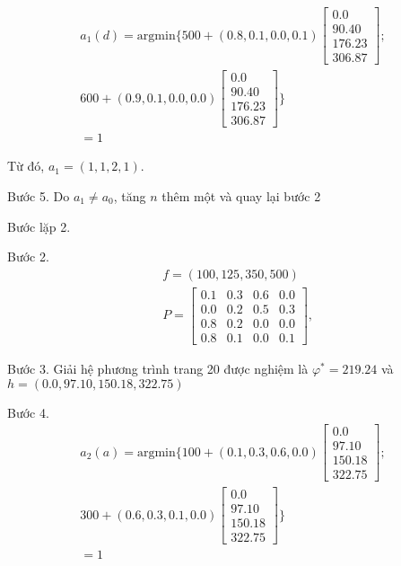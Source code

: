 \documentclass[12pt,a4paper]{report}
\begin{document}
\begin{align*}
a_1(d)=\mathrm{argmin}\{500+(0.8,0.1, 0.0,0.1)
\left[
\begin{array}{c}
0.0\\
90.40\\
176.23\\
306.87
\end{array}
\right];\\
600+(0.9,0.1,0.0,0.0)
\left[
\begin{array}{c}
0.0\\
90.40\\
176.23\\
306.87
\end{array}
\right]\}\\
=1
\end{align*}

Từ đó, $a_1=(1,1,2,1)$.

\medskip
\noindent
Bước 5. Do $a_1 \neq a_0$, tăng $n$ thêm một và quay lại bước 2

\medskip
\noindent
Bước lặp 2.

\medskip
\noindent
Bước 2.
\begin{align*}
&f=(100,125,350,500)\\
&P=\left[
\begin{array}{cccc}
0.1&0.3&0.6&0.0\\
0.0&0.2&0.5&0.3\\
0.8&0.2&0.0&0.0\\
0.8&0.1&0.0&0.1
\end{array}
\right],
\end{align*}

\medskip
\noindent
Bước 3. Giải hệ phương trình trang 20 được nghiệm là $\varphi^*=219.24$ và $h=(0.0,97.10,150.18,322.75)$

\medskip
\noindent
Bước 4. 
\begin{align*}
a_2(a)=\mathrm{argmin}\{100+(0.1,0.3, 0.6,0.0)
\left[
\begin{array}{c}
0.0\\
97.10\\
150.18\\
322.75
\end{array}
\right];\\
300+(0.6,0.3,0.1,0.0)
\left[
\begin{array}{c}
0.0\\
97.10\\
150.18\\
322.75
\end{array}
\right]\}\\
=1
\end{align*}
\end{document}
